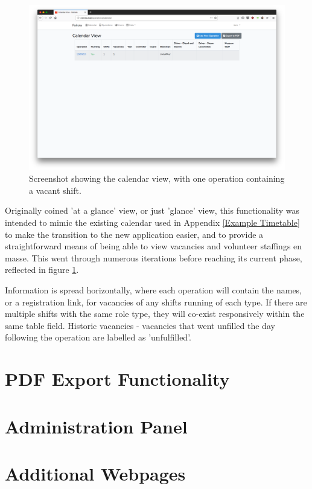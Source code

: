 \begin{figure}[!ht]
    \centering
    \includegraphics[width=1.0\textwidth]{Figures/screenshot-calendar}
    \caption{Screenshot showing the calendar view, with one operation containing a vacant shift.}
    \label{fig:calendarview}
\end{figure}

Originally coined 'at a glance' view, or just 'glance' view, this functionality was intended to mimic the existing calendar used in Appendix \ref{Example Timetable} to make the transition to the new application easier, and to provide a straightforward means of being able to view vacancies and volunteer staffings en masse. This went through numerous iterations before reaching its current phase, reflected in figure \ref{fig:calendarview}.

Information is spread horizontally, where each operation will contain the names, or a registration link, for vacancies of any shifts running of each type. If there are multiple shifts with the same role type, they will co-exist responsively within the same table field. Historic vacancies - vacancies that went unfilled the day following the operation are labelled as 'unfulfilled'.

\section{PDF Export Functionality}


\section{Administration Panel}

\section{Additional Webpages}